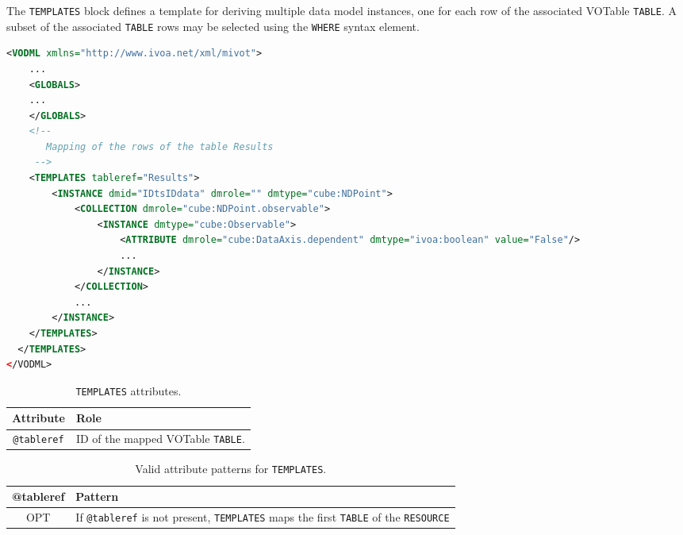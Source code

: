 The \texttt{TEMPLATES} block defines a template for deriving multiple data model instances,
one for each row of the associated VOTable \texttt{TABLE}.  A subset of the associated
\texttt{TABLE} rows may be selected using the \texttt{WHERE} syntax element.

\begin{lstlisting}[caption={Example of a \texttt{TEMPLATES} block mapping the rows of the table \texttt{Results} (see line~\ref{TEMPLATES_snippet} in Appendix~\ref{appendix_A}).},language=XML]
<VODML xmlns="http://www.ivoa.net/xml/mivot">
    ...
    <GLOBALS>
    ...
    </GLOBALS>
    <!--
       Mapping of the rows of the table Results
     -->  
    <TEMPLATES tableref="Results">
        <INSTANCE dmid="IDtsIDdata" dmrole="" dmtype="cube:NDPoint">
            <COLLECTION dmrole="cube:NDPoint.observable">
                <INSTANCE dmtype="cube:Observable">
                    <ATTRIBUTE dmrole="cube:DataAxis.dependent" dmtype="ivoa:boolean" value="False"/>
                    ...
                </INSTANCE>
            </COLLECTION>
            ...
        </INSTANCE>
    </TEMPLATES>
  </TEMPLATES>
</VODML>
\end{lstlisting}

\begin{table}[!htbp]
  \small
  \centering
  \begin{tabulary}{\linewidth}{|c|J|}
    \hline 
         \textbf{Attribute} & 
         \textbf {Role}\\
    \hline
    \hline  
         \texttt{@tableref} & 
         ID of the mapped VOTable \texttt{TABLE}.\\
    \hline 
  \end{tabulary}
  \caption{\texttt{TEMPLATES} attributes.} 
  \label{tbl:templates-att}
\end{table}

\begin{table}[!htbp]
  \small
  \centering
  \begin{tabulary}{\linewidth}{|c|J|}
    \hline 
        \textbf{@tableref} &
        \textbf{Pattern}\\
    \hline
    \hline  
        OPT &           
        If \texttt{@tableref} is not present, \texttt{TEMPLATES} maps the first \texttt{TABLE} of the \texttt{RESOURCE}\\
    \hline 
  \end{tabulary}
  \caption{Valid attribute patterns for  \texttt{TEMPLATES}.} 
  \label{tbl:templates-pattern}
 \end{table}

